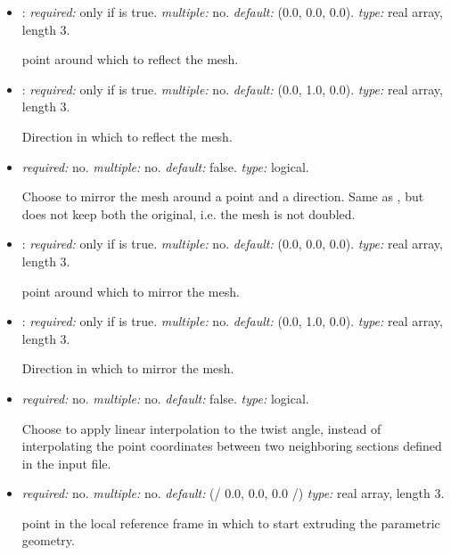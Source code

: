 \begin{itemize}
  \item {}: \textit{required:} only if  is true. \textit{multiple:} no. 
  \textit{default:} (0.0, 0.0, 0.0). \textit{type:} real array, length 3.

  point around which to reflect the mesh.

  \item {}: \textit{required:} only if  is true. \textit{multiple:} no. 
  \textit{default:} (0.0, 1.0, 0.0). \textit{type:} real array, length 3.

  Direction in which to reflect the mesh.

  \item {} \textit{required:} no. \textit{multiple:} no. \textit{default:} false. \textit{type:} logical.

  Choose to mirror the mesh around a point and a direction. Same as ,
  but does not keep both the original, i.e. the mesh is not doubled.

  \item {}:  \textit{required:} only if  is true. \textit{multiple:} no. 
  \textit{default:} (0.0, 0.0, 0.0). \textit{type:} real array, length 3.

  point around which to mirror the mesh.

  \item {}: \textit{required:} only if  is true. \textit{multiple:} no. 
  \textit{default:} (0.0, 1.0, 0.0). \textit{type:} real array, length 3.

  Direction in which to mirror the mesh.

  \item {} \textit{required:} no. 
  \textit{multiple:} no. \textit{default:} false. \textit{type:} logical.

  Choose to apply linear interpolation to the twist angle, instead of interpolating the point coordinates between two neighboring   sections defined in the input file.

  \item {} \textit{required:} no. \textit{multiple:} no. 
  \textit{default:} (/ 0.0, 0.0, 0.0 /) \textit{type:} real array, length 3.

  point in the local reference frame in which to start extruding the parametric geometry.


\end{itemize}
